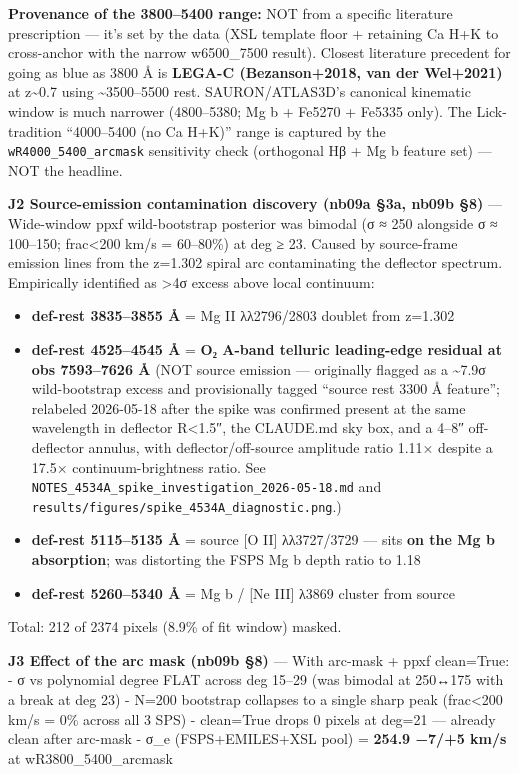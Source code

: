 \documentclass[
  10pt,
]{article}
\providecommand{\tightlist}{%
  \setlength{\itemsep}{0pt}\setlength{\parskip}{0pt}}
\begin{document}
\textbf{Provenance of the 3800--5400 range:} NOT from a specific literature prescription --- it's set by the data (XSL template floor + retaining Ca H+K to cross-anchor with the narrow w6500\_7500
result). Closest literature precedent for going as blue as 3800 Å is \textbf{LEGA-C (Bezanson+2018, van der Wel+2021)} at z\textasciitilde0.7 using \textasciitilde3500--5500 rest. SAURON/ATLAS3D's
canonical kinematic window is much narrower (4800--5380; Mg b + Fe5270 + Fe5335 only). The Lick-tradition ``4000--5400 (no Ca H+K)'' range is captured by the \texttt{wR4000\_5400\_arcmask} sensitivity
check (orthogonal Hβ + Mg b feature set) --- NOT the headline.

\textbf{J2 Source-emission contamination discovery (nb09a §3a, nb09b §8)} --- Wide-window ppxf wild-bootstrap posterior was bimodal (σ ≈ 250 alongside σ ≈ 100--150; frac\textless200 km/s = 60--80\%)
at deg ≥ 23. Caused by source-frame emission lines from the z=1.302 spiral arc contaminating the deflector spectrum. Empirically identified as \textgreater4σ excess above local continuum:

\begin{itemize}
\tightlist
\item
  \textbf{def-rest 3835--3855 Å} = Mg II λλ2796/2803 doublet from z=1.302
\item
  \textbf{def-rest 4525--4545 Å} = \textbf{O₂ A-band telluric leading-edge residual at obs 7593--7626 Å} (NOT source emission --- originally flagged as a \textasciitilde7.9σ wild-bootstrap excess and
  provisionally tagged ``source rest 3300 Å feature''; relabeled 2026-05-18 after the spike was confirmed present at the same wavelength in deflector R\textless1.5″, the CLAUDE.md sky box, and a 4--8″
  off-deflector annulus, with deflector/off-source amplitude ratio 1.11× despite a 17.5× continuum-brightness ratio. See \texttt{NOTES\_4534A\_spike\_investigation\_2026-05-18.md} and
  \texttt{results/figures/spike\_4534A\_diagnostic.png}.)
\item
  \textbf{def-rest 5115--5135 Å} = source {[}O II{]} λλ3727/3729 --- sits \textbf{on the Mg b absorption}; was distorting the FSPS Mg b depth ratio to 1.18
\item
  \textbf{def-rest 5260--5340 Å} = Mg b / {[}Ne III{]} λ3869 cluster from source
\end{itemize}

Total: 212 of 2374 pixels (8.9\% of fit window) masked.

\textbf{J3 Effect of the arc mask (nb09b §8)} --- With arc-mask + ppxf clean=True: - σ vs polynomial degree FLAT across deg 15--29 (was bimodal at 250↔175 with a break at deg 23) - N=200 bootstrap
collapses to a single sharp peak (frac\textless200 km/s = 0\% across all 3 SPS) - clean=True drops 0 pixels at deg=21 --- already clean after arc-mask - σ\_e (FSPS+EMILES+XSL pool) = \textbf{254.9
−7/+5 km/s} at wR3800\_5400\_arcmask
\end{document}

